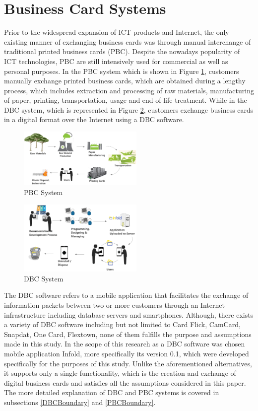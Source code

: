 \documentclass[conference]{IEEEtran}
\begin{document}
\section{Business Card Systems}

Prior to the widespread expansion of ICT products and Internet, the only existing manner of exchanging business cards was through manual interchange of traditional printed business cards (PBC). Despite the nowadays popularity of ICT technologies, PBC are still intensively used for commercial as well as personal purposes. In the PBC system which is shown in Figure \ref{PBCSystem}, customers manually exchange printed business cards, which are obtained during a lengthy process, which includes extraction and processing of raw materials, manufacturing of paper, printing, transportation, usage and end-of-life treatment. While in the DBC system, which is represented in Figure \ref{DBCSystem}, customers exchange business cards in a digital format over the Internet using a DBC software.

\begin{figure}[h]
\centering
\includegraphics[width=6cm]{PBCSystem1.png}
\caption{PBC System}
\label{PBCSystem}
\end{figure}

\begin{figure}[h]
\centering
\includegraphics[width=6cm]{DBCSystem.png}
\caption{DBC System}
\label{DBCSystem}
\end{figure}
The DBC software refers to a mobile application that facilitates the exchange of information packets between two or more customers through an Internet infrastructure including database servers and smartphones. Although, there exists a variety of DBC software including but not limited to Card Flick, CamCard, Snapdat, One Card, Flextown, none of them fulfills the purpose and assumptions made in this study. In the scope of this research as a DBC software was chosen mobile application Infold, more specifically its version 0.1, which were developed specifically for the purposes of this study. Unlike the aforementioned alternatives, it supports only a single functionality, which is the creation and exchange of digital business cards and satisfies all the assumptions considered in this paper. The more detailed explanation of DBC and PBC systems is covered in subsections \ref{DBCBoundary} and \ref{PBCBoundary}.
\end{document}
